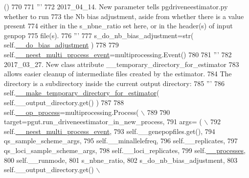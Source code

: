 \begin{DoxyCode}
      ()
770 
771         \textcolor{stringliteral}{'''}
772 \textcolor{stringliteral}{        2017\_04\_14. New parameter tells pgdriveneestimator.py whether to run}
773 \textcolor{stringliteral}{        the Nb bias adjustment, aside from whether there is a value present}
774 \textcolor{stringliteral}{        either in the s\_nbne\_ratio set here, or in  the header(s) of input genpop}
775 \textcolor{stringliteral}{        file(s).}
776 \textcolor{stringliteral}{        '''}
777         s\_do\_nb\_bias\_adjustment=str( self.\hyperlink{classnegui_1_1pgguineestimator_1_1PGGuiNeEstimator_a1e135d18d8ed94d7ee0e36529c0cfec2}{\_\_do\_bias\_adjustment} )
778 
779         self.\hyperlink{classnegui_1_1pgguineestimator_1_1PGGuiNeEstimator_a36087f6501ae61d71d58f7829b0c8505}{\_\_neest\_multi\_process\_event}=multiprocessing.Event()
780 
781         \textcolor{stringliteral}{'''}
782 \textcolor{stringliteral}{        2017\_03\_27.  New class attribute \_\_temporary\_directory\_for\_estimator}
783 \textcolor{stringliteral}{        allows easier cleanup of intermediate files created by the estimator.}
784 \textcolor{stringliteral}{        The directory is a subdirectory inside the current output directory:}
785 \textcolor{stringliteral}{        '''}
786         self.\hyperlink{classnegui_1_1pgguineestimator_1_1PGGuiNeEstimator_a3a4dbf2795304ea26aa22c8547e97ee2}{\_\_make\_temporary\_directory\_for\_estimator}( 
      self.\_\_output\_directory.get() )
787 
788         self.\hyperlink{classnegui_1_1pgguineestimator_1_1PGGuiNeEstimator_afdca00d33f75f1930108ec5c717d3051}{\_\_op\_process}=multiprocessing.Process( \(\backslash\)
789 
790                 target=pgut.run\_driveneestimator\_in\_new\_process,
791                     args= ( \(\backslash\)
792                             self.\hyperlink{classnegui_1_1pgguineestimator_1_1PGGuiNeEstimator_a36087f6501ae61d71d58f7829b0c8505}{\_\_neest\_multi\_process\_event},
793                             self.\_\_genepopfiles.get(),
794                             qs\_sample\_scheme\_args,
795                             self.\_\_minallelefreq,
796                             self.\_\_replicates,
797                             qs\_loci\_sample\_scheme\_args,
798                             self.\_\_loci\_replicates,
799                             self.\hyperlink{classnegui_1_1pgguineestimator_1_1PGGuiNeEstimator_a80dfa4d2fe2b0195f50076767ae640f5}{\_\_processes},
800                             self.\_\_runmode,
801                             s\_nbne\_ratio,
802                             s\_do\_nb\_bias\_adjustment,
803                             self.\_\_output\_directory.get() \(\backslash\)

\end{DoxyCode}
